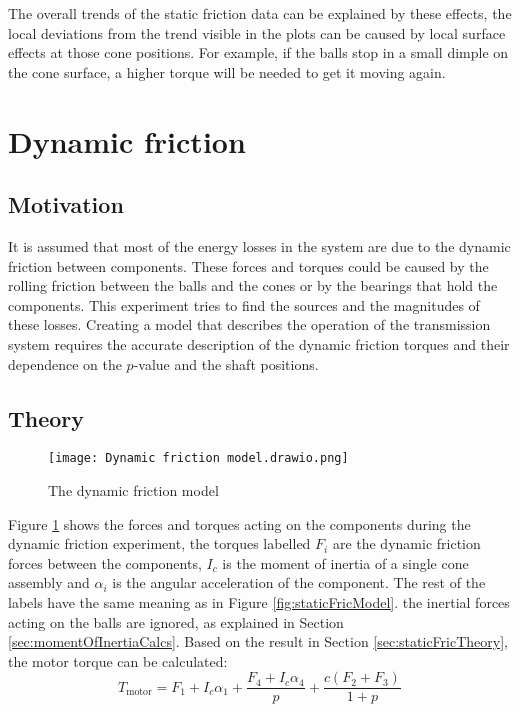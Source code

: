 \documentclass[12pt]{article}
\begin{document}
The overall trends of the static friction data can be explained by these effects, the local deviations from the trend visible in the plots can be caused by local surface effects at those cone positions. For example, if the balls stop in a small dimple on the cone surface, a higher torque will be needed to get it moving again.



\pagebreak

\section{Dynamic friction}
\subsection{Motivation}
It is assumed that most of the energy losses in the system are due to the dynamic friction between components. These forces and torques could be caused by the rolling friction between the balls and the cones or by the bearings that hold the components. This experiment tries to find the sources and the magnitudes of these losses. Creating a model that describes the operation of the transmission system requires the accurate description of the dynamic friction torques and their dependence on the $p$-value and the shaft positions.



\subsection{Theory}
\label{sec:dynamicTheory}
\begin{figure}[h]
    \centering
    \texttt{[image: Dynamic friction model.drawio.png]}
    \caption{The dynamic friction model}
    \label{fig:dynFricModel}
\end{figure}
Figure \ref{fig:dynFricModel} shows the forces and torques acting on the components during the dynamic friction experiment, the torques labelled $F_i$ are the dynamic friction forces between the components, $I_c$ is the moment of inertia of a single cone assembly and $\alpha_i$ is the angular acceleration of the component. The rest of the labels have the same meaning as in Figure \ref{fig:staticFricModel}. the inertial forces acting on the balls are ignored, as explained in Section \ref{sec:momentOfInertiaCalcs}. 
Based on the result in Section \ref{sec:staticFricTheory}, the motor torque can be calculated:
$$T_{\text{motor}} = F_1 + I_c\alpha_1 + \frac{F_4 + I_c \alpha_4 }{p} + \frac{c(F_2+F_3)}{1+p}$$
\end{document}
